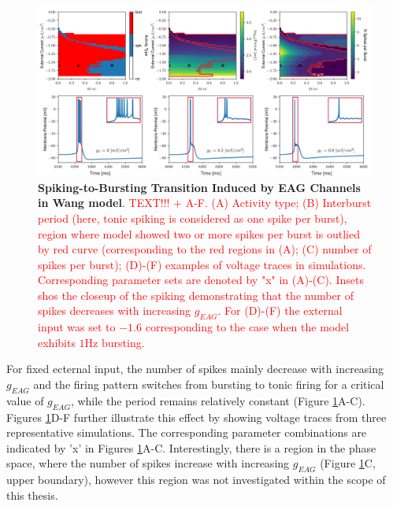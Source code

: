 \documentclass[../main.tex]{subfiles}
\begin{document}
\begin{figure}[!t]
    \centering
    \includegraphics[width=\linewidth]{../img/spiking_to_bursting/transition_imshow.png}
    \caption[Spiking-to-Bursting Transition Induced by EAG Channels in Wang model]{
        \textbf{Spiking-to-Bursting Transition Induced by EAG Channels in Wang model}. \textcolor{red}{TEXT!!! + A-F. (A) Activity type; (B) Interburst period (here, tonic spiking is considered as one spike per burst), region where model showed two or more spikes per burst is outlied by red curve (corresponding to the red regions in (A); (C) number of spikes per burst); (D)-(F) examples of voltage traces in simulations. Corresponding parameter sets are denoted by "x" in (A)-(C). Insets shos the closeup of the spiking demonstrating that the number of spikes decreases with increasing $g_{EAG}$. For (D)-(F) the external input was set to $-1.6$ corresponding to the case when the model exhibits $1$Hz bursting.}
    }
    \label{fig:spiking_to_bursting_wang_phase_diagram}
\end{figure}

For fixed ecternal input, the number of spikes mainly decrease with increasing $g_{EAG}$ and
the firing pattern switches from bursting to tonic firing for a critical value of $g_{EAG}$, while the period remains relatively constant (Figure \ref{fig:spiking_to_bursting_wang_phase_diagram}A-C).
Figures \ref{fig:spiking_to_bursting_wang_phase_diagram}D-F further illustrate this effect by showing voltage traces from three representative simulations. The corresponding parameter combinations are indicated by 'x' in Figures \ref{fig:spiking_to_bursting_wang_phase_diagram}A-C.
Interestingly, there is a region in the phase space, where the number of spikes increase with increasing $g_{EAG}$ (Figure \ref{fig:spiking_to_bursting_wang_phase_diagram}C, upper boundary), however this region was not investigated within the scope of this thesis.
\end{document}

